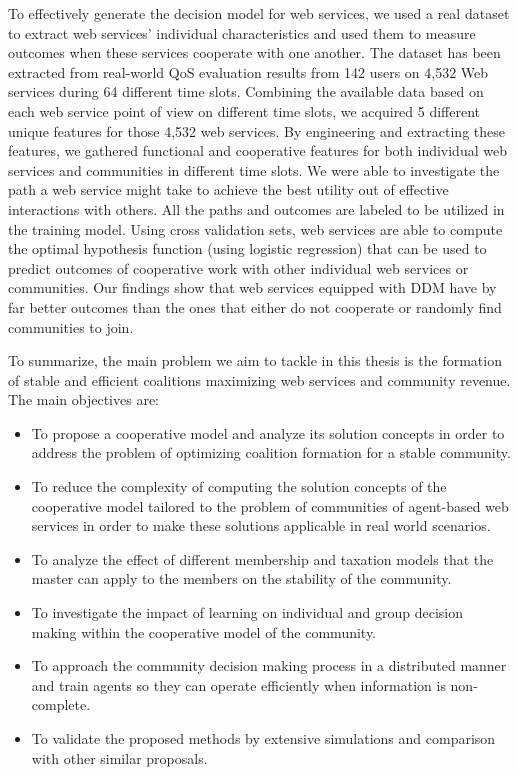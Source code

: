To effectively generate the decision model for web services, we used a real dataset to extract web services' individual characteristics and used them to measure outcomes when these services cooperate with one another. The dataset has been extracted from real-world QoS evaluation results from 142 users on 4,532 Web services during 64 different time slots. Combining the available data based on each web service point of view on different time slots, we acquired 5 different unique features for those 4,532 web services. By engineering and extracting these features, we gathered functional and cooperative features for both individual web services and communities in different time slots. We were able to investigate the path a web service might take to achieve the best utility out of effective interactions with others. All the paths and outcomes are labeled to be utilized in the training model. Using cross validation sets, web services are able to compute the optimal hypothesis function (using logistic regression) that can be used to predict outcomes of cooperative work with other individual web services or communities. Our findings show that web services equipped with DDM have by far better outcomes than the ones that either do not cooperate or randomly find communities to join.

\indent To summarize, the main problem we aim to tackle in this
thesis is the formation of stable and efficient coalitions
maximizing web services and community revenue. The main objectives
are:
\begin{itemize}
\item To propose a cooperative model and analyze its solution
concepts in order to address the problem of optimizing coalition
formation for a stable community.

\item To reduce the complexity of computing the solution concepts of the cooperative model tailored to the problem of communities of agent-based web services in order to make these solutions applicable in real world scenarios.

\item To analyze the effect of different membership and taxation models that the master can apply to the members on the stability of the community.

\item To investigate the impact of learning on individual and group decision making within the cooperative model of the community.

\item To approach the community decision making process in a distributed manner and train agents so they can operate efficiently when information is non-complete.

\item To validate the proposed methods by extensive simulations and comparison with other similar proposals.
\end{itemize}

